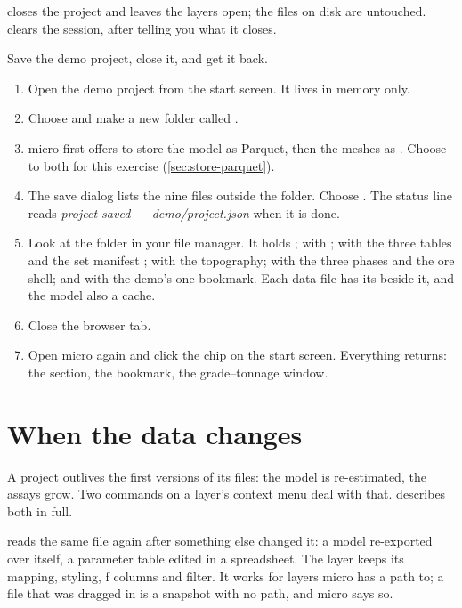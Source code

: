  closes the project and leaves the layers open; the files on disk are untouched.  clears the session, after telling you what it closes.

\begin{tryit}
Save the demo project, close it, and get it back.
\begin{enumerate}
\item Open the demo project from the start screen. It lives in memory only.
\item Choose  and make a new folder called .
\item micro first offers to store the model as Parquet, then the meshes as . Choose  to both for this exercise (\cref{sec:store-parquet}).
\item The save dialog lists the nine files outside the folder. Choose . The status line reads \emph{project saved — demo/project.json} when it is done.
\item Look at the folder in your file manager. It holds ;  with ;  with the three tables and the set manifest ;  with the topography;  with the three phases and the ore shell; and  with the demo's one bookmark. Each data file has its  beside it, and the model also a  cache.
\item Close the browser tab.
\item Open micro again and click the  chip on the start screen. Everything returns: the section, the bookmark, the grade–tonnage window.
\end{enumerate}
\end{tryit}

\section{When the data changes}\label{sec:projects-change}
A project outlives the first versions of its files: the model is re-estimated, the assays grow. Two commands on a layer's context menu deal with that.  describes both in full.

 reads the same file again after something else changed it: a model re-exported over itself, a parameter table edited in a spreadsheet. The layer keeps its mapping, styling, ƒ columns and filter. It works for layers micro has a path to; a file that was dragged in is a snapshot with no path, and micro says so.

